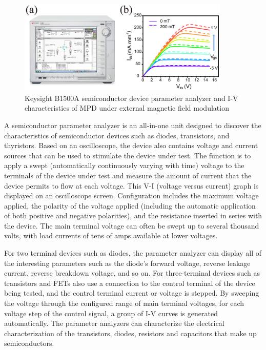 \begin{figure}[H] 
\centering    
\includegraphics[width=0.9\textwidth]{keysight}
\caption[Keysight B1500A semiconductor device parameter analyzer and I-V characteristics of MPD under external magnetic field modulation]{Keysight B1500A semiconductor device parameter analyzer and I-V characteristics of MPD under external magnetic field modulation}
\label{fig:keysight}
\end{figure}

A semiconductor parameter analyzer  is an all-in-one unit designed to discover the characteristics of semiconductor devices such as diodes, transistors, and thyristors. Based on an oscilloscope, the device also contains voltage and current sources that can be used to stimulate the device under test. The function is to apply a swept (automatically continuously varying with time) voltage to the terminals of the device under test and measure the amount of current that the device permits to flow at each voltage. This V-I (voltage versus current) graph is displayed on an oscilloscope screen. Configuration includes the maximum voltage applied, the polarity of the voltage applied (including the automatic application of both positive and negative polarities), and the resistance inserted in series with the device. The main terminal voltage can often be swept up to several thousand volts, with load currents of tens of amps available at lower voltages.

For two terminal devices such as diodes, the parameter analyzer can display all of the interesting parameters such as the diode's forward voltage, reverse leakage current, reverse breakdown voltage, and so on. For three-terminal devices such as transistors and FETs also use a connection to the control terminal of the device being tested, and the control terminal current or voltage is stepped. By sweeping the voltage through the configured range of main terminal voltages, for each voltage step of the control signal, a group of I-V curves is generated automatically. The parameter analyzers can characterize the electrical characterization of the transistors, diodes, resistors and capacitors that make up semiconductors. 

